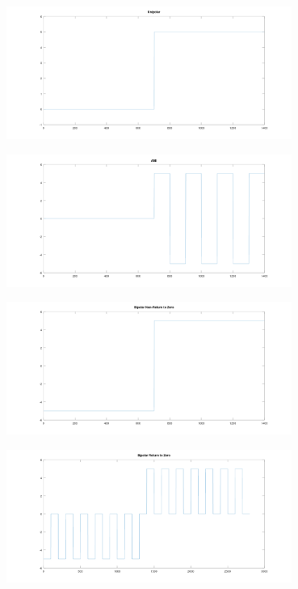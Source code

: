 \begin{enumerate}
        \begin{center}
            \centering
            \includegraphics[width=0.7\textwidth]{../octave/coding/sync/unipolar.png}
            \label{img:coding-sync-unipolar}
        \end{center}
        \begin{center}
            \centering
            \includegraphics[width=0.7\textwidth]{../octave/coding/sync/ami.png}
            \label{img:coding-sync-ami}
        \end{center}
        \begin{center}
            \centering
            \includegraphics[width=0.7\textwidth]{../octave/coding/sync/bipolarnrz.png}
            \label{img:coding-sync-nrz}
        \end{center}
        \begin{center}
            \centering
            \includegraphics[width=0.7\textwidth]{../octave/coding/sync/bipolarrz.png}

\end{center}
\end{enumerate}
